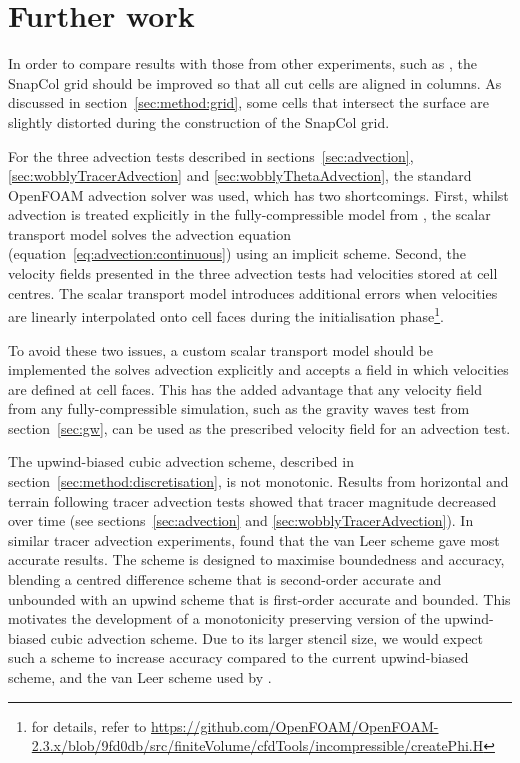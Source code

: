 \chapter{Further work}

In order to compare results with those from other experiments, such as \textcite{good2013}, the SnapCol grid should be improved so that all cut cells are aligned in columns.  As discussed in section~\ref{sec:method:grid}, some cells that intersect the surface are slightly distorted during the construction of the SnapCol grid.

For the three advection tests described in sections~\ref{sec:advection}, \ref{sec:wobblyTracerAdvection} and \ref{sec:wobblyThetaAdvection}, the standard OpenFOAM advection solver was used, which has two shortcomings.  First, whilst advection is treated explicitly in the fully-compressible model from \textcite{weller-shahrokhi2014}, the scalar transport model solves the advection equation (equation~\ref{eq:advection:continuous}) using an implicit scheme.  Second, the velocity fields presented in the three advection tests had velocities stored at cell centres.  The scalar transport model introduces additional errors when velocities are linearly interpolated onto cell faces during the initialisation phase\footnote{for details, refer to \url{https://github.com/OpenFOAM/OpenFOAM-2.3.x/blob/9fd0db/src/finiteVolume/cfdTools/incompressible/createPhi.H}}.

To avoid these two issues, a custom scalar transport model should be implemented the solves advection explicitly and accepts a field in which velocities are defined at cell faces.  This has the added advantage that any velocity field from any fully-compressible simulation, such as the gravity waves test from section~\ref{sec:gw}, can be used as the prescribed velocity field for an advection test.

The upwind-biased cubic advection scheme, described in section~\ref{sec:method:discretisation}, is not monotonic.  Results from horizontal and terrain following tracer advection tests showed that tracer magnitude decreased over time (see sections~\ref{sec:advection} and \ref{sec:wobblyTracerAdvection}).
In similar tracer advection experiments, \textcite{jones2013} found that the van Leer scheme gave most accurate results.  The scheme is designed to maximise boundedness and accuracy, blending a centred difference scheme that is second-order accurate and unbounded with an upwind scheme that is first-order accurate and bounded.  This motivates the development of a monotonicity preserving version of the upwind-biased cubic advection scheme.  Due to its larger stencil size, we would expect such a scheme to increase accuracy compared to the current upwind-biased scheme, and the van Leer scheme used by \textcite{jones2013}.

